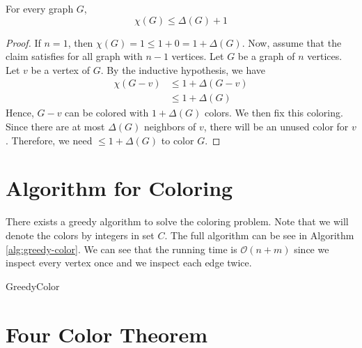 \begin{theorem}
  For every graph \(G\), 
  \[ \chi(G) \leq \Delta(G) + 1 \]
\end{theorem}

\begin{proof}
  If \(n=1\), then \(\chi(G) = 1 \leq 1+0 = 1 + \Delta(G)\). Now,
  assume that the claim satisfies for all graph with \(n-1\)
  vertices. Let \(G\) be a graph of \(n\) vertices. Let \(v\) be
  a vertex of \(G\). By the inductive hypothesis, we have
  \[
    \begin{aligned}
      \chi(G-v) &\leq 1 + \Delta(G-v) \\
                &\leq 1 + \Delta(G)
    \end{aligned}
  \]
  Hence, \(G-v\) can be colored with \(1+\Delta(G)\) colors. We
  then fix this coloring. Since there are at most \(\Delta(G)\)
  neighbors of \(v\), there will be an unused color for \(v\).
  Therefore, we need \(\leq 1+\Delta(G)\) to color \(G\).
\end{proof}

\section{Algorithm for Coloring}

There exists a greedy algorithm to solve the coloring problem.
Note that we will denote the colors by integers in set \(C\). The
full algorithm can be see in Algorithm \ref{alg:greedy-color}.
We can see that the running time is \(\mathcal{O}(n+m)\) since we
inspect every vertex once and we inspect each edge twice.

\begin{algorithm}
\caption{GreedyColor}
\label{alg:greedy-color}
\begin{algorithmic}
  \EndFor
\end{algorithmic}
\end{algorithm}

\section{Four Color Theorem}

